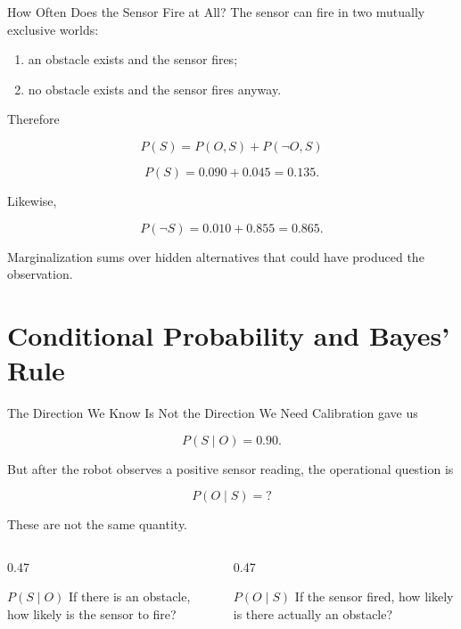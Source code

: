 \documentclass[aspectratio=169,10pt]{beamer}
\begin{document}
\begin{frame}[shrink=10]{How Often Does the Sensor Fire at All?}
  The sensor can fire in two mutually exclusive worlds:

  \begin{enumerate}
    \item an obstacle exists and the sensor fires;
    \item no obstacle exists and the sensor fires anyway.
  \end{enumerate}

  Therefore

  \[
    P(S)=P(O,S)+P(\neg O,S)
  \]

  \[
    P(S)=0.090+0.045=0.135.
  \]

  Likewise,

  \[
    P(\neg S)=0.010+0.855=0.865.
  \]

  \begin{keyidea}
    Marginalization sums over hidden alternatives that could have produced the observation.
  \end{keyidea}
\end{frame}

\section{Conditional Probability and Bayes' Rule}

\begin{frame}[shrink=10]{The Direction We Know Is Not the Direction We Need}
  Calibration gave us

  \[
    P(S\mid O)=0.90.
  \]

  But after the robot observes a positive sensor reading, the operational question is

  \[
    \boxed{P(O\mid S)=?}
  \]

  These are not the same quantity.

  \begin{columns}[T,onlytextwidth]
    \begin{column}{0.47\textwidth}
      \begin{block}{$P(S\mid O)$}
        If there is an obstacle, how likely is the sensor to fire?
      \end{block}
    \end{column}
    \begin{column}{0.47\textwidth}
      \begin{block}{$P(O\mid S)$}
        If the sensor fired, how likely is there actually an obstacle?
      \end{block}
    \end{column}
  \end{columns}
\end{frame}
\end{document}
